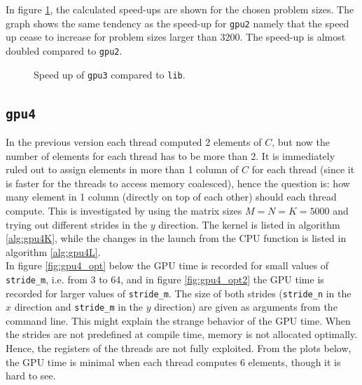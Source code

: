 \noindent In figure \ref{fig:speed_gpu3}, the calculated speed-ups are shown for the chosen problem sizes. The graph shows the same tendency as the speed-up for \texttt{gpu2} namely that the speed up cease to increase for problem sizes larger than 3200. The speed-up is almost doubled compared to \texttt{gpu2}.

\begin{figure}[H]
\centering
{}
\caption{Speed up of \texttt{gpu3} compared to \texttt{lib}.}
\label{fig:speed_gpu3}
\end{figure}

\subsection{\texttt{gpu4}}
In the previous version each thread computed 2 elements of $C$, but now the number of elements for each thread has to be more than 2. It is immediately ruled out to assign elements in more than 1 column of $C$ for each thread (since it is faster for the threads to access memory coalesced), hence the question is: how many element in 1 column (directly on top of each other) should each thread compute. This is investigated by using the matrix sizes $M=N=K=5000$ and trying out different strides in the $y$ direction. The kernel is listed in algorithm \ref{alg:gpu4K}, while the changes in the launch from the CPU function is listed in algorithm \ref{alg:gpu4L}.\\




\noindent In figure \ref{fig:gpu4_opt} below the GPU time is recorded for small values of \texttt{stride\_m}, i.e. from 3 to 64, and in figure \ref{fig:gpu4_opt2} the GPU time is recorded for larger values of \texttt{stride\_m}. The size of both strides (\texttt{stride\_n} in the $x$ direction and \texttt{stride\_m} in the $y$ direction) are given as arguments from the command line. This might explain the strange behavior of the GPU time. When the strides are not predefined at compile time, memory is not allocated optimally. Hence, the registers of the threads are not fully exploited. From the plots below, the GPU time is minimal when each thread computes 6 elements, though it is hard to see.  

